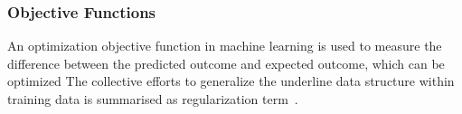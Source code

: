 \subsubsection{Objective Functions}
An optimization objective function in machine learning is used to measure the difference between the predicted outcome and expected outcome, which can be optimized  The collective efforts to generalize the underline data structure within training data is summarised as regularization term~\cite{goodfellow_2015}.  